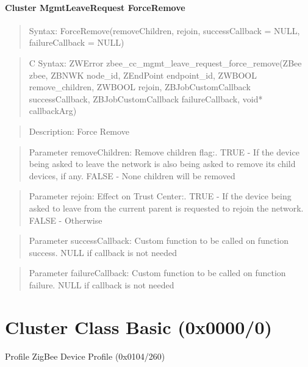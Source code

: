 \paragraph{Cluster MgmtLeaveRequest ForceRemove}
\begin{quote}Syntax: ForceRemove(removeChildren, rejoin, successCallback = NULL, failureCallback = NULL)\end{quote}
\begin{quote}C Syntax: ZWError zbee\_cc\_mgmt\_leave\_request\_force\_remove(ZBee zbee, ZBNWK node\_id, ZEndPoint endpoint\_id, ZWBOOL remove\_children, ZWBOOL rejoin, ZBJobCustomCallback successCallback, ZBJobCustomCallback failureCallback, void* callbackArg)\end{quote}
\begin{quote}Description: Force Remove\end{quote}
\begin{quote}Parameter removeChildren: Remove children flag:. TRUE  - If the device being asked to leave the network is also being asked to remove its child devices, if any. FALSE - None children will be removed\end{quote}
\begin{quote}Parameter rejoin: Effect on Trust Center:. TRUE  - If the device being asked to leave from the current parent is requested to rejoin the network. FALSE - Otherwise\end{quote}
\begin{quote}Parameter successCallback: Custom function to be called on function success. NULL if callback is not needed\end{quote}
\begin{quote}Parameter failureCallback: Custom function to be called on function failure. NULL if callback is not needed\end{quote}



\section{Cluster Class Basic (0x0000/0)}

Profile ZigBee Device Profile (0x0104/260)

